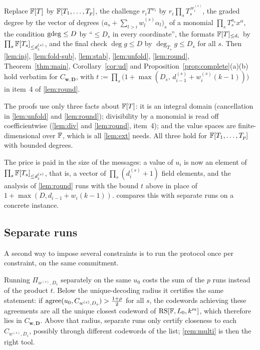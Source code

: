 {\sloppy
\begin{remark}\label{rem:multi}
Replace $\mathbb{F}[T]$ by $\mathbb{F}[T_1,\dots,T_p]$, the challenge $r_iT^{w_i}$ by
$r_i\prod_sT_s^{\,w^{(s)}_i}$, the graded degree by the vector of degrees
$\big(a_s+\sum_{l>i}w^{(s)}_l\alpha_l\big)_s$ of a monomial
$\prod_sT_s^{a_s}x^\alpha$, the condition $\mathrm{gdeg}\le D$ by ``$\le D_s$ in every
coordinate'', the formats $\mathbb{F}[T]_{\le d_i}$ by $\prod_s\mathbb{F}[T_s]_{\le d^{(s)}_i}$, and the final
check $\deg g\le D$ by $\deg_{T_s}g\le D_s$ for all $s$. Then \cref{lem:inj},
\cref{lem:fold-sub}, \cref{lem:stab}, \cref{lem:unfold}, \cref{lem:round}, Theorem~\ref{thm:main},
Corollary~\ref{cor:ud} and Proposition~\ref{prop:complete}(a)(b) hold verbatim for
$C_{\mathbf w,\mathbf D}$, with $t:=\prod_s\big(1+\max(D_s,\,d^{(s)}_{i-1}+w^{(s)}_i(k-1))\big)$
in item~4 of \cref{lem:round}.

The proofs use only three facts about $\mathbb{F}[T]$: it is an integral domain (cancellation in
\cref{lem:unfold} and \cref{lem:round}); divisibility by a monomial is read off coefficientwise
(\cref{lem:div} and \cref{lem:round}, item~4); and the value spaces are finite-dimensional over
$\mathbb{F}$, which is all \cref{lem:ext} needs. All three hold for $\mathbb{F}[T_1,\dots,T_p]$ with bounded
degrees.
\end{remark}\par}

The price is paid in the size of the messages: a value of $u_i$ is now an element of
$\prod_s\mathbb{F}[T_s]_{\le d^{(s)}_i}$, that is, a vector of $\prod_s(d^{(s)}_i+1)$ field elements,
and the analysis of \cref{lem:round} runs with the bound $t$ above in place of
$1+\max(D,d_{i-1}+w_i(k-1))$.  compares this with separate runs on a
concrete instance.

\subsection{Separate runs}\label{sec:separate}

A second way to impose several constraints is to run the protocol once per constraint, on the same
commitment.

\begin{remark}\label{rem:separate}
Running $\Pi_{w^{(s)},D_s}$ separately on the same $u_0$ costs the sum of the $p$ runs
instead of the product $t$. Below the unique-decoding radius it certifies the same
statement: if $\mathrm{agree}(u_0,C_{w^{(s)},D_s})>\frac{1+\rho}2$ for all $s$, the codewords
achieving these agreements are all the unique closest codeword of
$\mathrm{RS}[\mathbb{F},L_0,k^m]$, which therefore lies in $C_{\mathbf w,\mathbf D}$. Above that radius,
separate runs only certify closeness to each $C_{w^{(s)},D_s}$, possibly through different
codewords of the list; \cref{rem:multi} is then the right tool.
\end{remark}

